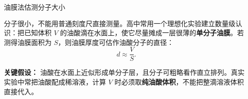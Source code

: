 \begin{conceptbox}{油膜法估测分子大小}

分子很小，不能用普通刻度尺直接测量。高中常用一个理想化实验建立数量级认识：把已知体积 $V$ 的油酸滴在水面上，使它尽量摊成一层很薄的\textbf{单分子油膜}。若测得油膜面积为 $S$，则油膜厚度可估作油酸分子的直径：
\[
\boxed{d\approx\frac{V}{S}}.
\]

\begin{center}


\label{fig:oil-film-molecule-size}
\end{center}

\textbf{关键假设：} 油酸在水面上近似形成单分子层，且分子可粗略看作直立排列。真实实验中常把油酸配成稀溶液，计算 $V$ 时必须取\textbf{纯油酸体积}，不能把整滴溶液体积直接代入。
\end{conceptbox}

